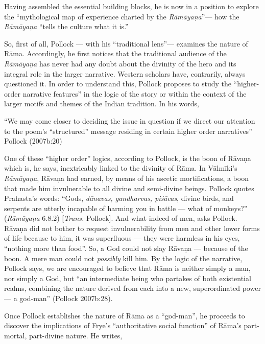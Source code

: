 Having assembled the essential building blocks, he is now in a position to explore the “mythological map of experience charted by the {\sl Rāmāyaṇa}”--- how the {\sl Rāmāyaṇa} “tells the culture what it is.” 

\newpage

So, first of all, Pollock --- with his “traditional lens”--- examines the nature of Rāma. Accordingly, he first notices that the traditional audience of the {\sl Rāmāyaṇa} has never had any doubt about the divinity of the hero and its integral role in the larger narrative. Western scholars have, contrarily, always questioned it. In order to understand this, Pollock proposes to study the “higher-order narrative features” in the logic of the story or within the context of the larger motifs and themes of the Indian tradition. In his words,

\begin{myquote}
“We may come closer to deciding the issue in question if we direct our attention to the poem’s “structured” message residing in certain higher order narratives”
\hfill Pollock (2007b:20)
\end{myquote}

One of these “higher order” logics, according to Pollock, is the boon of Rāvaṇa which is, he says, inextricably linked to the divinity of Rāma. In Vālmīki’s {\sl Rāmāyaṇa}, Rāvaṇa had earned, by means of his ascetic mortifications, a boon that made him invulnerable to all divine and semi-divine beings.  Pollock quotes Prahasta’s words: “Gods, {\sl dānavas, gandharvas, piśācas}, divine birds, and serpents are utterly incapable of harming you in battle --- what of monkeys?” ({\sl Rāmāyaṇa} 6.8.2) [{\sl Trans.} Pollock]. And what indeed of men, asks Pollock. Rāvaṇa did not bother to request invulnerability from men and other lower forms of life because to him, it was superfluous --- they were harmless in his eyes, “nothing more than food”. So, a God could not slay Rāvaṇa --- because of the boon. A mere man could not {\sl possibly} kill him. By the logic of the narrative, Pollock says, we are encouraged to believe that Rāma is neither simply a man, nor simply a God, but “an intermediate being who partakes of both existential realms, combining the nature derived from each into a new, superordinated power --- a god-man” (Pollock 2007b:28).  

Once Pollock establishes the nature of Rāma as a “god-man”, he proceeds to discover the implications of Frye’s “authoritative social function” of Rāma’s part-mortal, part-divine nature. He writes, 

